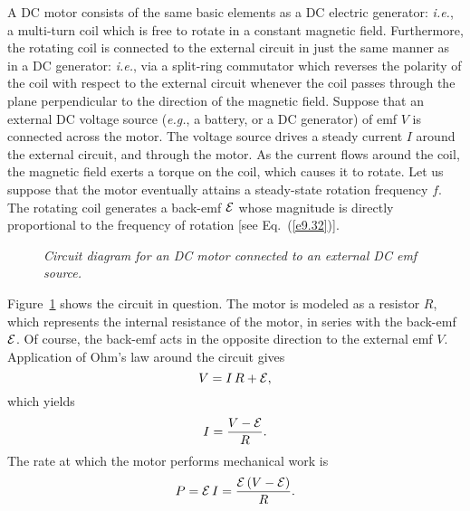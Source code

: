 A DC motor consists of the same basic elements as a DC electric generator:
{\em i.e.}, a multi-turn coil which is free to rotate in a constant magnetic
field. Furthermore, the rotating coil is connected to the external circuit
in just the same manner as in a DC generator: {\em i.e.}, via a split-ring
commutator which reverses the polarity of the coil with respect to
the external circuit whenever the coil passes through the plane perpendicular
to the direction of the  magnetic field. Suppose that an
external DC voltage source 
({\em e.g.}, a battery, or a DC generator) of emf $V$ is connected across the motor.
The voltage source drives a steady current $I$ around the external
circuit, and through the motor. As the current flows around the coil,
the magnetic field exerts a torque  on the coil, which causes it to rotate.
Let us suppose that the motor eventually attains  a steady-state rotation
frequency $f$. The rotating coil generates a back-emf ${\cal E}$ whose
magnitude is directly proportional to the frequency of rotation [see Eq.~(\ref{e9.32})]. 

\begin{figure}
\epsfysize=3in
\centerline{}
\caption{\em Circuit diagram for an DC motor connected to an external
DC emf source.}\label{f9.11}
\end{figure}

Figure~\ref{f9.11} shows the circuit in question. The motor is modeled
as a resistor $R$, which represents the internal resistance of the
motor, in series with the back-emf ${\cal E}$. Of course, the back-emf
acts in the opposite direction to the external emf $V$. Application of Ohm's
law around the circuit gives
\begin{equation}
V = I\,R + {\cal E},
\end{equation}
which yields
\begin{equation}\label{e9.40}
I = \frac{V-{\cal E}}{R}.
\end{equation}
The rate at which the motor performs mechanical work is
\begin{equation}\label{e9.41}
P = {\cal E} \,I = \frac{{\cal E} \,(V - {\cal E})}{R}.
\end{equation}

